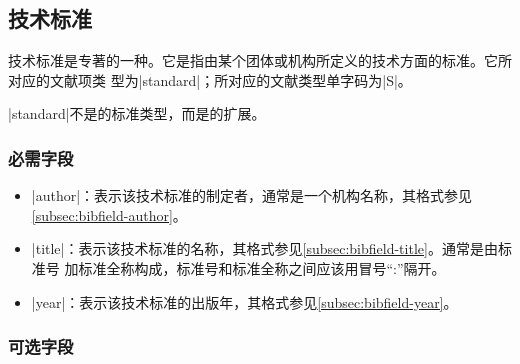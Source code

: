 
\subsection{技术标准}\label{subsec:bibtype-standard}

技术标准是专著的一种。它是指由某个团体或机构所定义的技术方面的标准。它所对应的{\BibTeX}文献项类
型为|standard|；所对应的文献类型单字码为|S|\cite{gbt3469-1983}。

|standard|不是{\BibTeX}的标准类型，而是{\njuthesis}的扩展。

\subsubsection{必需字段}

\begin{itemize}
\item |author|：表示该技术标准的制定者，通常是一个机构名称，其格式参见\ref{subsec:bibfield-author}。
\item |title|：表示该技术标准的名称，其格式参见\ref{subsec:bibfield-title}。通常是由标准号
 加标准全称构成，标准号和标准全称之间应该用冒号``:''隔开。
\item |year|：表示该技术标准的出版年，其格式参见\ref{subsec:bibfield-year}。
\end{itemize}

\subsubsection{可选字段}

